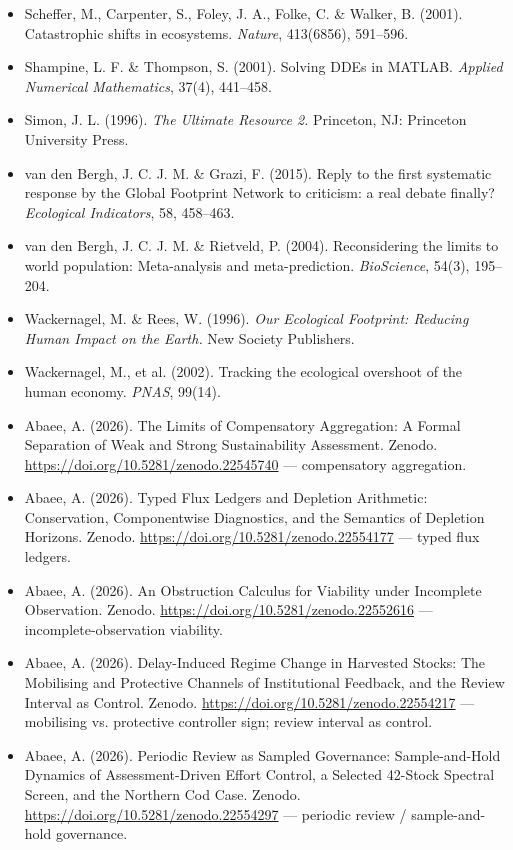 \documentclass[11pt]{article}
\begin{document}
\begin{itemize}
\item Scheffer, M., Carpenter, S., Foley, J. A., Folke, C. \& Walker, B. (2001). Catastrophic shifts in ecosystems. \emph{Nature}, 413(6856), 591–596.
\item Shampine, L. F. \& Thompson, S. (2001). Solving DDEs in MATLAB. \emph{Applied Numerical Mathematics}, 37(4), 441–458.
\item Simon, J. L. (1996). \emph{The Ultimate Resource 2.} Princeton, NJ: Princeton University Press.
\item van den Bergh, J. C. J. M. \& Grazi, F. (2015). Reply to the first systematic response by the Global Footprint Network to criticism: a real debate finally? \emph{Ecological Indicators}, 58, 458–463.
\item van den Bergh, J. C. J. M. \& Rietveld, P. (2004). Reconsidering the limits to world population: Meta-analysis and meta-prediction. \emph{BioScience}, 54(3), 195–204.
\item Wackernagel, M. \& Rees, W. (1996). \emph{Our Ecological Footprint: Reducing Human Impact on the Earth.} New Society Publishers.
\item Wackernagel, M., et al. (2002). Tracking the ecological overshoot of the human economy. \emph{PNAS}, 99(14).
\item Abaee, A. (2026). The Limits of Compensatory Aggregation: A Formal Separation of Weak and Strong Sustainability Assessment. Zenodo. \url{https://doi.org/10.5281/zenodo.22545740} — compensatory aggregation.
\item Abaee, A. (2026). Typed Flux Ledgers and Depletion Arithmetic: Conservation, Componentwise Diagnostics, and the Semantics of Depletion Horizons. Zenodo. \url{https://doi.org/10.5281/zenodo.22554177} — typed flux ledgers.
\item Abaee, A. (2026). An Obstruction Calculus for Viability under Incomplete Observation. Zenodo. \url{https://doi.org/10.5281/zenodo.22552616} — incomplete-observation viability.
\item Abaee, A. (2026). Delay-Induced Regime Change in Harvested Stocks: The Mobilising and Protective Channels of Institutional Feedback, and the Review Interval as Control. Zenodo. \url{https://doi.org/10.5281/zenodo.22554217} — mobilising vs. protective controller sign; review interval as control.
\item Abaee, A. (2026). Periodic Review as Sampled Governance: Sample-and-Hold Dynamics of Assessment-Driven Effort Control, a Selected 42-Stock Spectral Screen, and the Northern Cod Case. Zenodo. \url{https://doi.org/10.5281/zenodo.22554297} — periodic review / sample-and-hold governance.

\end{itemize}
\end{document}
